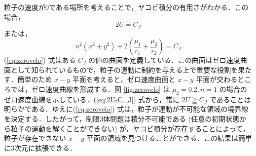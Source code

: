 \documentclass[11pt,a4paper,oneside,onecolumn]{jarticle}
\begin{document}
粒子の速度が0である場所を考えることで，ヤコビ積分の有用さがわかる．この場合，
\begin{equation}
2 U = C_J
\end{equation}
または，
\begin{equation}
n^2 (x^2 + y^2) + 2 \left( \frac{\mu_1}{r_1} + \frac{\mu_2}{r_2} \right) = C_J \label{eq:zerovelo}
\end{equation}
(\ref{eq:zerovelo}) 式はある $C_J$ の値の曲面を定義している．この曲面はゼロ速度曲面として知られているもので，粒子の運動に制約を与える上で重要な役割を果たす．簡単のため $x-y$ 平面を考えると，ゼロ速度曲面と $x-y$ 平面が交わるところでは，ゼロ速度曲線を形成する．図 \ref{fig:zerovelo} は $\mu_2 = 0.2, n = 1$ の場合のゼロ速度曲線を示している．(\ref{eq:2U-C_J}) 式から，常に $2 U \geqq C_J$ であることは明らかである．ゆえに(\ref{eq:zerovelo}) 式は，粒子が運動が不可能な領域の境界線を決定する．したがって，制限3体問題は積分不可能である (任意の初期状態から粒子の運動を解くことができない) が，ヤコビ積分が存在することによって，粒子が存在できない $x-y$ 平面の領域を見つけることができる．この結果は簡単に3次元に拡張できる．
\end{document}
